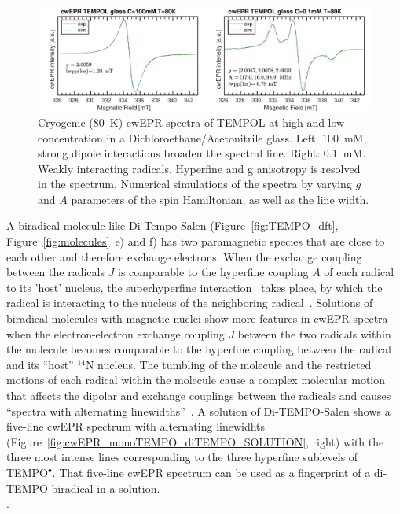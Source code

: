 \begin{figure}[h]
\center
	\includegraphics[width=1\textwidth]{./operando_epr/figures/TEMPOL/cwEPR_TEMPOL_100mM_vs_p1mM_80K.pdf}
	\caption{Cryogenic (80~K) cwEPR spectra of TEMPOL at high and low concentration in a Dichloroethane/Acetonitrile glass. Left: 100~mM, strong dipole interactions broaden the spectral line. Right: 0.1~mM. Weakly interacting radicals. Hyperfine and g anisotropy is resolved in the spectrum. Numerical simulations of the spectra by varying $g$ and $A$ parameters of the spin Hamiltonian, as well as the line width.}
	\label{fig:cwEPR_TEMPOL_High_Low_Concentrations}
\end{figure}



\par
A biradical molecule like Di-Tempo-Salen (Figure~\ref{fig:TEMPO_dft}, Figure~\ref{fig:molecules}~e) and f) has two paramagnetic species that are close to each other and therefore exchange electrons. When the exchange coupling between the radicals $J$ is comparable to the hyperfine coupling $A$ of each radical to its 'host' nucleus, the superhyperfine interaction~\cite{Carrington_solution_epr} takes place, by which the radical is interacting to the nucleus of the neighboring radical~\cite{Eaton2018}. Solutions of biradical molecules with magnetic nuclei show more features in cwEPR spectra when the electron-electron exchange coupling $J$ between the two radicals within the molecule becomes comparable to the hyperfine coupling between the radical and its ``host'' $^{14}$N nucleus. The tumbling of the molecule and the restricted motions of each radical within the molecule cause a complex molecular motion that affects the dipolar and exchange couplings between the radicals and causes ``spectra with alternating linewidths''~\cite{Eaton2018,Carrington_g_factor}. A solution of Di-TEMPO-Salen shows a five-line cwEPR spectrum with alternating linewidhts (Figure~\ref{fig:cwEPR_monoTEMPO_diTEMPO_SOLUTION}, right) with the three most intense lines corresponding to the three hyperfine sublevels of TEMPO$^{\bullet}$. That five-line cwEPR spectrum can be used as a fingerprint of a di-TEMPO biradical in a solution.\\
\newpage
.
\newpage
